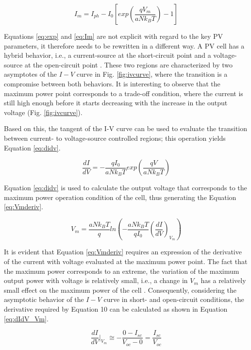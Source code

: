 \begin{equation}
\label{eq:Im}
I_{m} =I_{ph}-I_{0}\left[ exp \left( \dfrac{qV_{m}}{aNk_{B}T} \right) -1 \right] 
\end{equation}

Equations \ref{eq:exp} and \ref{eq:Im} are not explicit with regard to the key PV  parameters, it therefore needs to be rewritten in a different way. A PV cell has a hybrid behavior, i.e., a current-source at the short-circuit point and a voltage-source at the open-circuit point \cite{Saloux}. These two regions are characterized by two asymptotes of the $ I-V $ curve in Fig. \ref{fig:ivcurve}, where the transition is a compromise between both behaviors. It is interesting to observe that the maximum power point corresponds to a trade-off condition, where the current is still high enough before it starts decreasing with the increase in the output voltage (Fig. \ref{fig:ivcurve}).

Based on this, the tangent of the I-V curve can be used to evaluate the transition between current- to voltage-source controlled regions; this operation yields Equation \ref{eq:didv}.

\begin{equation}
\label{eq:didv}
\dfrac{dI}{dV}=-\dfrac{qI_{0}}{aNk_{B}T}exp \left( \dfrac{qV}{aNk_{B}T}  \right) 
\end{equation}

Equation \ref{eq:didv} is used to calculate the output voltage that corresponds to the maximum power operation condition of the cell, thus generating the Equation \ref{eq:Vmderiv}.

\begin{equation}
\label{eq:Vmderiv}
V_{m}=\dfrac{aNk_{B}T}{q} ln \left( -\dfrac{aNk_{B}T}{qI_{0}} \left( \dfrac{dI}{dV}  \right)_{V_{m}}   \right) 
\end{equation}

It is evident that Equation \ref{eq:Vmderiv} requires an expression of the derivative of the current with voltage evaluated at the maximum power point. The fact that the maximum power corresponds to an extreme, the variation of the maximum output power with voltage is relatively small, i.e., a change in $ V_{m} $ has a relatively small effect on the maximum power of the cell \cite{Saloux}. Consequently, considering the asymptotic behavior of the $I-V$ curve in short- and open-circuit conditions, the derivative required by Equation 10 can be calculated as shown in Equation \ref{eq:dIdV_Vm}.

\begin{equation}
\label{eq:dIdV_Vm}
\dfrac{dI}{dV}\vert_{V_{m}} \cong -\dfrac{0-I_{sc}}{V_{oc}-0}=\dfrac{I_{sc}}{V_{oc}}
\end{equation}

